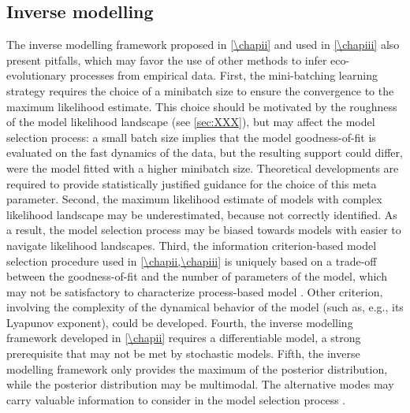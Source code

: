 \subsection{Inverse modelling}
The inverse modelling framework proposed in \cref{\chapii} and used in \cref{\chapiii} also present pitfalls, which may favor the use of other methods to infer eco-evolutionary processes from empirical data.
%
First, the mini-batching learning strategy requires the choice of a minibatch size to ensure the convergence to the maximum likelihood estimate. This choice should be motivated by the roughness of the model likelihood landscape (see \cref{sec:XXX}), but may affect the model selection process:
a small batch size implies that the model goodness-of-fit is evaluated on the fast dynamics of the data, but the resulting support could differ, were the model fitted with a higher minibatch size. Theoretical developments are required to provide statistically justified guidance for the choice of this meta parameter. 
% 
Second, the maximum likelihood estimate of models with complex likelihood landscape may be underestimated, because not correctly identified. As a result, the model selection process may be biased towards models with easier to navigate likelihood landscapes. 
% 
Third, the information criterion-based model selection procedure used in \cref{\chapii,\chapiii} is uniquely based on a trade-off between the goodness-of-fit and the number of parameters of the model, which may not be satisfactory to characterize process-based model \citep{Clermont2015}. 
% 
Other criterion, involving the complexity of the dynamical behavior of the model (such as, e.g., its Lyapunov exponent), could be developed.
% 
Fourth, the inverse modelling framework developed in \cref{\chapii} requires a differentiable model, a strong prerequisite that may not be met by stochastic models. 
% 
Fifth, the inverse modelling framework only provides the maximum of the posterior distribution, while the posterior distribution may be multimodal. The alternative modes may carry valuable information to consider in the model selection process \citep{Daniels2015}.%

